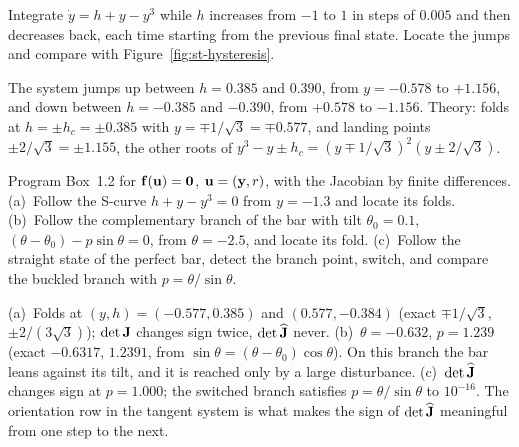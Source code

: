 \label{exo:st-computer-hysteresis}
%
Integrate $\dot y = h + y - y^3$ while $h$ increases from $-1$ to $1$ in steps of
$0.005$ and then decreases back, each time starting from the previous final state.
Locate the jumps and compare with Figure~\ref{fig:st-hysteresis}.
\begin{solution}
The system jumps up between $h = 0.385$ and $0.390$, from $y = -0.578$ to
$+1.156$, and down between $h = -0.385$ and $-0.390$, from $+0.578$ to $-1.156$.
Theory: folds at $h = \pm h_c = \pm 0.385$ with $y = \mp 1/\sqrt3 = \mp 0.577$, and
landing points $\pm 2/\sqrt3 = \pm 1.155$, the other roots of
$y^3 - y \pm h_c = (y \mp 1/\sqrt3)^2(y \pm 2/\sqrt3)$.

\end{solution}

\label{exo:st-computer-arclength}
%
Program Box~1.2 for $\mathbf{f}(\mathbf{u}) = \mathbf{0}$, $\mathbf{u} = (\mathbf{y},r)$, with the
Jacobian by finite differences. (a)~Follow the S-curve $h + y - y^3 = 0$ from
$y = -1.3$ and locate its folds. (b)~Follow the complementary branch of the bar with
tilt $\theta_0 = 0.1$, $(\theta - \theta_0) - p\sin\theta = 0$, from $\theta = -2.5$,
and locate its fold. (c)~Follow the straight state of the perfect bar, detect the
branch point, switch, and compare the buckled branch with $p = \theta/\sin\theta$.
\begin{solution}
(a)~Folds at $(y,h) = (-0.577, 0.385)$ and $(0.577,-0.384)$ (exact
$\mp1/\sqrt3$, $\pm2/(3\sqrt3)$); $\det\mathbf{J}$ changes sign twice, $\det\widehat{\mathbf{J}}$
never. (b)~$\theta = -0.632$, $p = 1.239$ (exact $-0.6317$, $1.2391$, from
$\sin\theta = (\theta - \theta_0)\cos\theta$). On this branch the bar leans against its
tilt, and it is reached only by a large disturbance. (c)~$\det\widehat{\mathbf{J}}$ changes
sign at $p = 1.000$; the switched branch satisfies $p = \theta/\sin\theta$ to
$10^{-16}$. The orientation row in the tangent system is what makes the sign of
$\det\widehat{\mathbf{J}}$ meaningful from one step to the next.

\end{solution}

